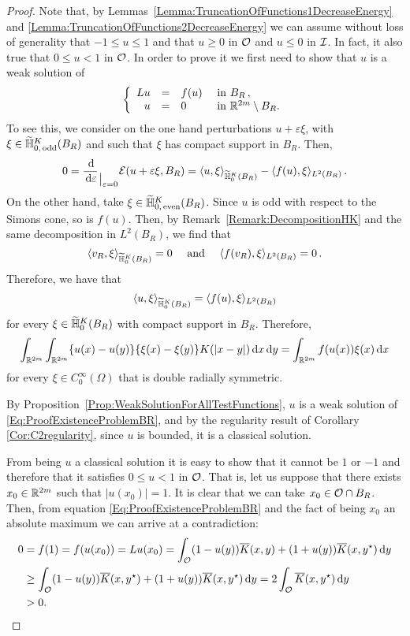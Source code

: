 \begin{proof}

Note that, by Lemmas~\ref{Lemma:TruncationOfFunctions1DecreaseEnergy} and \ref{Lemma:TruncationOfFunctions2DecreaseEnergy} we can assume without loss of generality that $-1 \leq u \leq 1$ and that $u \geq 0$ in $\mathcal{O}$ and $u \leq 0$ in $\mathcal{I}$. In fact, it also true that $0\leq u < 1$ in $\mathcal{O}$. In order to prove it we first need to show that $u$ is a weak solution of
\begin{equation}
\label{Eq:ProofExistenceProblemBR}
	\left\{\begin{array}{rcll}
	L u &=& f(u) & \textrm{ in } B_R\,,\\
	u &=& 0 & \textrm{ in }\mathbb{R}^{2m} \setminus B_R.
	\end{array} \right.
\end{equation}
To see this, we consider on the one hand perturbations $u +  \varepsilon \xi$, with $\xi \in \widetilde{\mathbb{H}}^K_{0, \,\mathrm{odd}}(B_R)$ and such that $\xi$ has compact support in $B_R$. Then,
$$
0 = \dfrac{\,\mathrm{d}}{\,\mathrm{d} \varepsilon}_{\mkern1.5mu\big\vert_{\scriptstyle \varepsilon = 0}} \mathcal{E}(u +  \varepsilon \xi, B_R) = \langle u,\xi \rangle_{\widetilde{\mathbb{H}}^K_0(B_R)} - \langle f(u),\xi \rangle_{L^2(B_R)}\,.
$$
On the other hand, take $\xi \in \widetilde{\mathbb{H}}^K_{0, \,\mathrm{even}}(B_R)$. Since $u$ is odd with
respect to the Simons cone, so is $f(u)$. Then, by Remark~\ref{Remark:DecompositionHK} and the same
decomposition in $L^2(B_R)$, we find that
$$
\langle v_R,\xi \rangle_{\widetilde{\mathbb{H}}^K_0(B_R)} = 0 \quad \textrm{ and } \quad  \langle f(v_R),\xi \rangle_{L^2(B_R)} = 0\,.
$$
Therefore, we have that
$$
\langle u,\xi \rangle_{\widetilde{\mathbb{H}}^K_0(B_R)} = \langle f(u),\xi \rangle_{L^2(B_R)}
$$
for every $\xi \in\widetilde{\mathbb{H}}^K_0(B_R)$ with compact support in  $B_R$. Therefore,
$$
\int_{\mathbb{R}^{2m}}\int_{\mathbb{R}^{2m}} \{u(x)-u(y)\}\{\xi(x)-\xi(y)\} K(|x-y|) \,\mathrm{d} x \,\mathrm{d} y = \int_{\mathbb{R}^{2m}} f(u(x)) \xi(x) \,\mathrm{d} x
$$
for every $\xi \in C^\infty_0(\Omega)$ that is double radially symmetric.

By Proposition~\ref{Prop:WeakSolutionForAllTestFunctions}, $u$ is a weak solution of \eqref{Eq:ProofExistenceProblemBR}, and by the regularity result of Corollary \ref{Cor:C2regularity}, since $u$ is bounded, it is a classical solution.

From being $u$ a classical solution it is easy to show that it cannot be $1$ or $-1$ and therefore that it satisfies $0\leq u < 1$ in $\mathcal{O}$. That is, let us suppose that there exists $x_0\in\mathbb{R}^{2m}$ such that $|u(x_0)|=1$. It is clear that we can take $x_0\in\mathcal{O}\cap B_R$. Then, from equation \eqref{Eq:ProofExistenceProblemBR} and the fact of being $x_0$ an absolute maximum we can arrive at a contradiction:
\begin{align*}
0 &= f(1) = f(u(x_0)) = Lu(x_0) = \int_{\mathcal{O}} (1-u(y)) \overline{K}(x,y) + (1+u(y)) \overline{K}(x,y^\star)  \,\mathrm{d} y \\
&\geq \int_{\mathcal{O}} (1-u(y)) \overline{K}(x,y^\star) + (1+u(y)) \overline{K}(x,y^\star)  \,\mathrm{d} y = 2\int_{\mathcal{O}} \overline{K}(x,y^\star) \,\mathrm{d} y\\
&>0.
\end{align*}



\end{proof}
